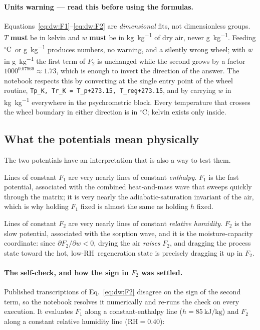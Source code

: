 \documentclass[11pt]{article}
\newcommand{\RH}{\ensuremath{\mathrm{RH}}}
\newcommand{\degC}{\ensuremath{^{\circ}\mathrm{C}}}
\begin{document}
\paragraph{Units warning --- read this before using the formulas.}
Equations~\eqref{eq:dw:F1}--\eqref{eq:dw:F2} are \emph{dimensional} fits, not
dimensionless groups. $T$ \textbf{must} be in kelvin and $w$ \textbf{must} be
in \si{\kilogram\per\kilogram} of dry air, never \si{\gram\per\kilogram}.
Feeding \degC\ or \si{\gram\per\kilogram} produces numbers, no warning, and a
silently wrong wheel; with $w$ in \si{\gram\per\kilogram} the first term of
$F_2$ is unchanged while the second grows by a factor $1000^{0.07969}\approx
1.73$, which is enough to invert the direction of the answer. The notebook
respects this by converting at the single entry point of the wheel routine,
\texttt{Tp\_K, Tr\_K = T\_p+273.15, T\_reg+273.15}, and by carrying $w$ in
\si{\kilogram\per\kilogram} everywhere in the psychrometric block. Every
temperature that crosses the wheel boundary in either direction is in \degC;
kelvin exists only inside.

\subsection{What the potentials mean physically}
\label{sec:dw:meaning}

The two potentials have an interpretation that is also a way to test them.

Lines of constant $F_1$ are very nearly lines of constant \emph{enthalpy}.
$F_1$ is the fast potential, associated with the combined heat-and-mass wave
that sweeps quickly through the matrix; it is very nearly the
adiabatic-saturation invariant of the air, which is why holding $F_1$ fixed is
almost the same as holding $h$ fixed.

Lines of constant $F_2$ are very nearly lines of constant \emph{relative
humidity}. $F_2$ is the slow potential, associated with the sorption wave, and
it is the moisture-capacity coordinate: since $\partial F_2/\partial w<0$,
drying the air \emph{raises} $F_2$, and dragging the process state toward the
hot, low-\RH\ regeneration state is precisely dragging it up in $F_2$.

\paragraph{The self-check, and how the sign in $F_2$ was settled.}
Published transcriptions of Eq.~\eqref{eq:dw:F2} disagree on the sign of the
second term, so the notebook resolves it numerically and re-runs the check on
every execution. It evaluates $F_1$ along a constant-enthalpy line
($h = \SI{85}{\kilo\joule\per\kilogram}$) and $F_2$ along a constant relative
humidity line ($\RH = 0.40$):
\end{document}
